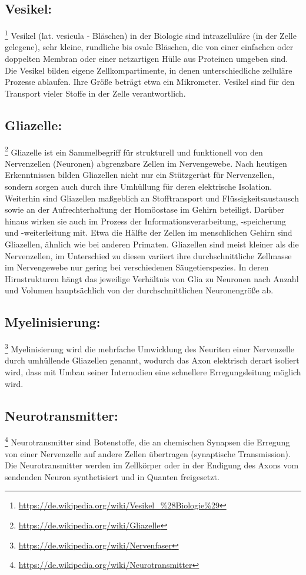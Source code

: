 \subsection{Vesikel:}\footnote{\url{https://de.wikipedia.org/wiki/Vesikel_\%28Biologie\%29}} Vesikel (lat. vesicula - Bläschen) in der Biologie sind intrazelluläre (in der Zelle gelegene), sehr kleine, rundliche bis ovale Bläschen, die von einer einfachen oder doppelten Membran oder einer netzartigen Hülle aus Proteinen umgeben sind. Die Vesikel bilden eigene Zellkompartimente, in denen unterschiedliche zelluläre Prozesse ablaufen. Ihre Größe beträgt etwa ein Mikrometer. Vesikel sind für den Transport vieler Stoffe in der Zelle verantwortlich.

\subsection{Gliazelle:}\footnote{\url{https://de.wikipedia.org/wiki/Gliazelle}} Gliazelle ist ein Sammelbegriff für strukturell und funktionell von den Nervenzellen (Neuronen) abgrenzbare Zellen im Nervengewebe. Nach heutigen Erkenntnissen bilden Gliazellen nicht nur ein Stützgerüst für Nervenzellen, sondern sorgen auch durch ihre Umhüllung für deren elektrische Isolation. Weiterhin sind Gliazellen maßgeblich an Stofftransport und Flüssigkeitsaustausch sowie an der Aufrechterhaltung der Homöostase im Gehirn beteiligt. Darüber hinaus wirken sie auch im Prozess der Informationsverarbeitung, -speicherung und -weiterleitung mit.
Etwa die Hälfte der Zellen im menschlichen Gehirn sind Gliazellen, ähnlich wie bei anderen Primaten. Gliazellen sind meist kleiner als die Nervenzellen, im Unterschied zu diesen variiert ihre durchschnittliche Zellmasse im Nervengewebe nur gering bei verschiedenen Säugetierspezies. In deren Hirnstrukturen hängt das jeweilige Verhältnis von Glia zu Neuronen nach Anzahl und Volumen hauptsächlich von der durchschnittlichen Neuronengröße ab.

\subsection{Myelinisierung:}\footnote{\url{https://de.wikipedia.org/wiki/Nervenfaser}} Myelinisierung wird die mehrfache Umwicklung des Neuriten einer Nervenzelle durch umhüllende Gliazellen genannt, wodurch das Axon elektrisch derart isoliert wird, dass mit Umbau seiner Internodien eine schnellere Erregungsleitung möglich wird.

\subsection{Neurotransmitter:}\footnote{\url{https://de.wikipedia.org/wiki/Neurotransmitter}} Neurotransmitter sind Botenstoffe, die an chemischen Synapsen die Erregung von einer Nervenzelle auf andere Zellen übertragen (synaptische Transmission). Die Neurotransmitter werden im Zellkörper oder in der Endigung des Axons vom sendenden Neuron synthetisiert und in Quanten freigesetzt.

